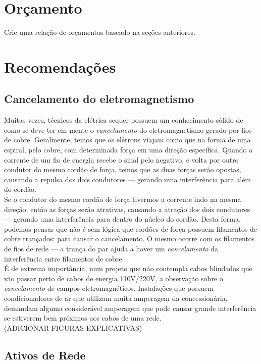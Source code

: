 \documentclass[	DIV=calc,%
							paper=a4,%
							fontsize=12pt,%
							onecolumn]{scrartcl}	 					%
\begin{document}
\section{Orçamento}
Crie uma relação de orçamentos baseado na seções anteriores.

\section{Recomendações}

\subsection{Cancelamento do eletromagnetismo}

Muitas vezes, técnicos da elétrica sequer possuem um conhecimento sólido de como se deve ter em mente o \textit{cancelamento} do eletromagnetismo gerado por fios de cobre. Geralmente, temos que os elétrons viajam como que na forma de uma espiral, pelo cobre, com determinada força em uma direção específica. Quando a corrente de um fio de energia recebe o sinal pelo negativo, e volta por outro condutor do mesmo cordão de força, temos que as duas forças serão opostas, causando a repulsa dos dois condutores --- gerando uma interferência para além do cordão. 
\\

Se o condutor do mesmo cordão de força tivermos a corrente indo na mesma direção, então as forças serão atrativas, causando a atração dos dois condutores --- gerando uma interferência para dentro do núcleo do cordão. Desta forma, podemos pensar que não é sem lógica que cordões de força possuem filamentos de cobre trançados: para causar o cancelamento. O mesmo ocorre com os filamentos de fios de rede --- a trança do par ajuda a haver um \textit{cancelamento} da interferência entre filamentos de cobre.
\\

É de extrema importância, num projeto que não contempla cabos blindados  que vão passar perto de cabos de energia 110V/220V, a observação sobre o \textit{cancelamento} de campos eletromagnéticos. Instalações que possuem condicionadores de ar que utilizam muita amperagem da concessionária, demandam alguma considerável amperagem que pode causar grande interferência se estiverem bem próximos aos cabos de uma rede.  
\\

(ADICIONAR FIGURAS EXPLICATIVAS)

\subsection{Ativos de Rede}
\end{document}
